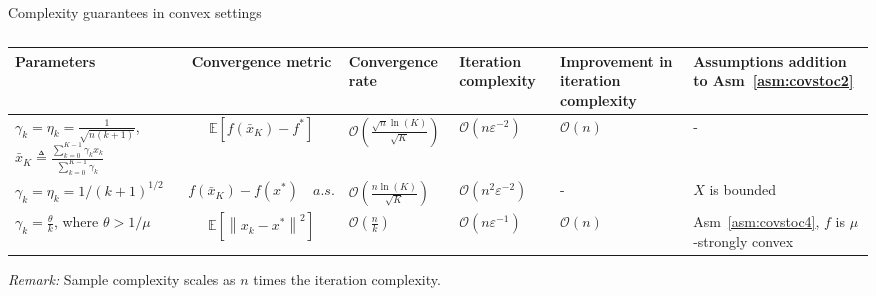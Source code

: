 \documentclass[11pt,reqno]{amsart}
\newcommand{\1}{{\bf 1}}
\newcommand{\2}{{\bf 2}}
\newcommand{\E}{\mathbb E}
\numberwithin{equation}{section}
\theoremstyle{remark}
\begin{document}
{			\begin{table}[htb]
				\scriptsize
				\centering
				\caption{}{{Complexity guarantees} in convex {settings}}
				\renewcommand{\arraystretch}{2}
				\begin{tabular}{ C{3cm} c C{2cm}  C{1.8cm} C{1.8cm} C{2.7cm} }
					\hline
					Parameters&Convergence metric&  Convergence rate &Iteration complexity&Improvement {in iteration complexity} &Assumptions addition to Asm~\ref{asm:covstoc2} \\
					\hline
					$\gamma_k=\eta_k=\tfrac{1}{\sqrt{n(k+1)}}$,  $\bar{x}_{K} \triangleq \tfrac{\sum_{k=0}^{{K-1}} \gamma_{k} x_{k}}{\sum_{k=0}^{{K-1}}\gamma_{k}}$  & $\mathbb{E}\left[f\left(\bar{x}_{K}\right)-f^{*}\right]$  & $\mathcal{O}\left(\tfrac{\sqrt{n} \ln(K)}{\sqrt{K}}\right)$&$\mathcal{O}(n\varepsilon^{-2})$&${\mathcal{O}(n)}$&-\\
					\hline
					$\gamma_k=\eta_k=1/(k+1)^{1/2}$ &  $ f(\bar{x}_K)-f(x^*) \quad a.s.$& $\mathcal{O}\left(\frac{n\ln (K)}{\sqrt{K}}\right) $&$\mathcal{O}(n^2\varepsilon^{-2})$&-&$X$ is bounded \\
					\hline
					$ \gamma_{k}=\tfrac{\theta}{k} $, where $ \theta>1 /  \mu $   & $\mathbb{E}\left[\left\|x_{k}-x^{*}\right\|^{2}\right] $ &$ \mathcal{O}\left(\tfrac{n}{k}\right)$&$\mathcal{O}(n\varepsilon^{-1})$&${\mathcal{O}(n)}$&Asm~\ref{asm:covstoc4}, $f$ is $\mu$-strongly convex\\
					\hline
				\end{tabular}
				\vspace{0.1em}
				
				{\textit{Remark:} Sample complexity scales as $n$ times the iteration complexity.}
			\end{table}
			
}
\end{document}

